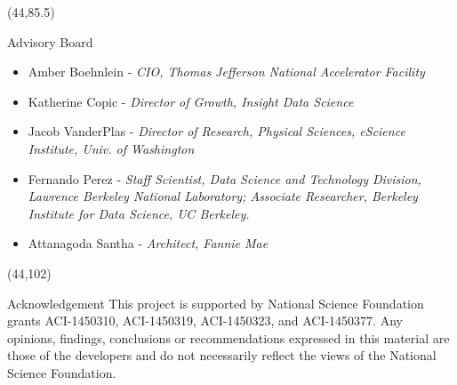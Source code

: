 \documentclass[final]{beamer}
\begin{document}
\begin{frame}{}
\begin{textblock}{38.0}(44,85.5)
\begin{block}{Advisory Board}
\begin{itemize}
\item Amber Boehnlein - {\it CIO, Thomas Jefferson National Accelerator Facility}
\item Katherine Copic - {\it Director of Growth, Insight Data Science}
\item Jacob VanderPlas - {\it Director of Research, Physical Sciences, eScience Institute, Univ. of Washington}
\item Fernando Perez - {\it Staff Scientist, Data Science and Technology Division, Lawrence Berkeley National Laboratory; Associate Researcher, Berkeley Institute for Data Science, UC Berkeley.}
\item Attanagoda Santha - {\it Architect, Fannie Mae}
\end{itemize}
\end{block}
\end{textblock}



\begin{textblock}{38.0}(44,102)
\begin{block}{Acknowledgement}
This project is supported by National Science Foundation grants ACI-1450310, ACI-1450319, ACI-1450323, and ACI-1450377. Any opinions, findings, conclusions or recommendations expressed in this material are those of the developers and do not necessarily reflect the views of the National Science Foundation.
\end{block}
\end{textblock}




\end{frame}
\end{document}
